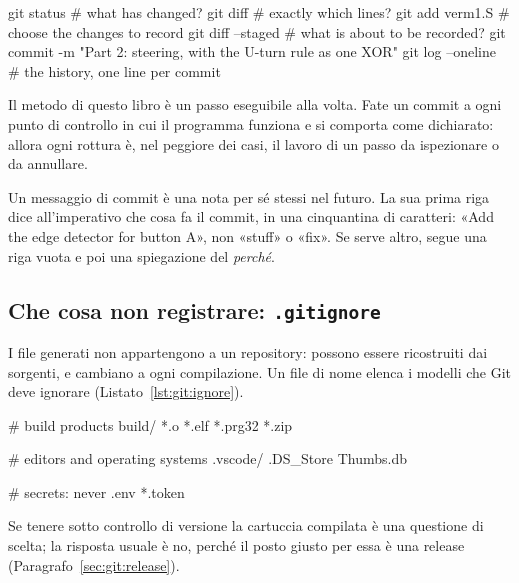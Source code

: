 \begin{shell}[caption={Ispezionare, preparare, registrare.},label=lst:git:cycle]
git status                      # what has changed?
git diff                        # exactly which lines?
git add verm1.S                 # choose the changes to record
git diff --staged               # what is about to be recorded?
git commit -m "Part 2: steering, with the U-turn rule as one XOR"
git log --oneline               # the history, one line per commit
\end{shell}

\begin{prgconcept}
Il metodo di questo libro è un passo eseguibile alla volta. Fate un commit a
ogni punto di controllo in cui il programma funziona e si comporta come
dichiarato: allora ogni rottura è, nel peggiore dei casi, il lavoro di un
passo da ispezionare o da annullare.
\end{prgconcept}

Un messaggio di commit è una nota per sé stessi nel futuro. La sua prima riga
dice all'imperativo che cosa fa il commit, in una cinquantina di caratteri:
«Add the edge detector for button A», non «stuff» o «fix». Se serve altro,
segue una riga vuota e poi una spiegazione del \emph{perché}.

\subsection{Che cosa non registrare: \texttt{.gitignore}}

I file generati non appartengono a un repository: possono essere ricostruiti
dai sorgenti, e cambiano a ogni compilazione. Un file di nome
 elenca i modelli che Git deve ignorare
(Listato~\ref{lst:git:ignore}).

\begin{plain}[caption={Un \fname{.gitignore} per un progetto di cartuccia.},label=lst:git:ignore]
# build products
build/
*.o
*.elf
*.prg32
*.zip

# editors and operating systems
.vscode/
.DS_Store
Thumbs.db

# secrets: never
.env
*.token
\end{plain}

Se tenere sotto controllo di versione la cartuccia compilata è una questione
di scelta; la risposta usuale è no, perché il posto giusto per essa è una
release (Paragrafo~\ref{sec:git:release}).

